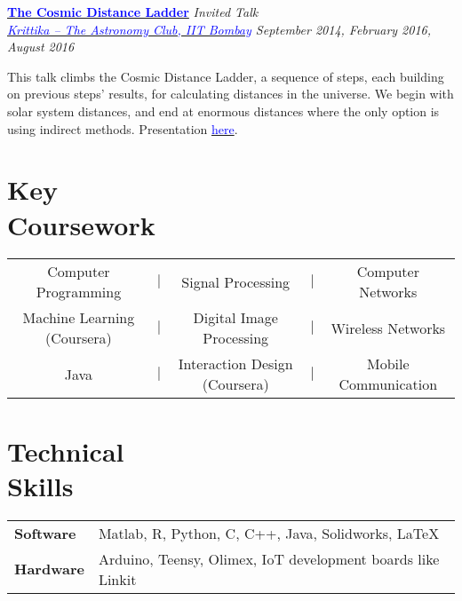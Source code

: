 \documentclass[margin,line]{res}
\newenvironment{list1}{
  \begin{list}{\ding{113}}{%
      \setlength{\itemsep}{0in}
      \setlength{\parsep}{0in} \setlength{\parskip}{0in}
      \setlength{\topsep}{0in} \setlength{\partopsep}{0in} 
      \setlength{\leftmargin}{0.17in}}}{\end{list}}
\begin{document}
\begin{resume}
\vspace*{-0.1in}

{\bf \href{http://www.stab-iitb.org/krittika/the-cosmic-ladder-distance}{\textcolor{blue} {The Cosmic Distance Ladder}}} \hfill {\em Invited Talk} \\
{\em \href{http://www.stab-iitb.org/krittika/}{\textcolor{blue} {Krittika -- The Astronomy Club, IIT Bombay}} \hfill September 2014, February 2016, August 2016} \\
\vspace*{-.15in}
\begin{list1}
\item[] This talk climbs the Cosmic Distance Ladder, a sequence of steps, each building on previous steps' results, for calculating distances in the universe. We begin with solar system distances, and end at enormous distances where the only option is using indirect methods. Presentation \href{http://alankarkotwal.github.io/CosmicDistanceLadder.pptx}{\textcolor{blue} {here}}.
\end{list1}

\vspace*{-0.1in}

\section{\sc Key \\Coursework} 
\begin{tabular}{ccccc}
Computer Programming & $|$ & Signal Processing & $|$ & Computer Networks \\
Machine Learning (Coursera) & $|$ & Digital Image Processing & $|$ & Wireless Networks \\
Java & $|$ & Interaction Design (Coursera) & $|$ & Mobile Communication
\end{tabular}

\section{\sc Technical \\Skills} 
\begin{tabular}{@{}p{1.3in}p{4.3in}}
\textbf{Software} & Matlab, R, Python, C, C++, Java, Solidworks, \LaTeX \\  
\vspace*{-0.06in}
\textbf{Hardware} & 
\vspace*{-0.06in}
Arduino, Teensy, Olimex, IoT development boards like Linkit \\ 
\end{tabular}


\end{resume}
\end{document}
